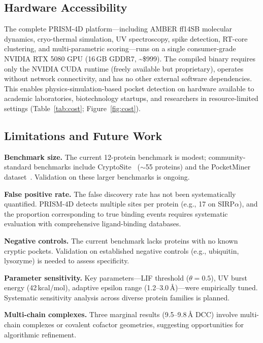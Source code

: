 \documentclass{sn-jnl}
\begin{document}
\subsection{Hardware Accessibility}

The complete PRISM-4D platform---including AMBER ff14SB molecular dynamics, cryo-thermal
simulation, UV spectroscopy, spike detection, RT-core clustering, and multi-parametric
scoring---runs on a single consumer-grade NVIDIA RTX 5080 GPU (16\,GB GDDR7,
\textasciitilde\$999). The compiled binary requires only the NVIDIA CUDA runtime (freely
available but proprietary), operates without network connectivity, and has no other external
software dependencies. This enables physics-simulation-based pocket detection on hardware
available to academic laboratories, biotechnology startups, and researchers in
resource-limited settings (Table~\ref{tab:cost}; Figure~\ref{fig:cost}).

\subsection{Limitations and Future Work}

\textbf{Benchmark size.} The current 12-protein benchmark is modest; community-standard
benchmarks include CryptoSite~\cite{cimermancic2016} ($\sim$55 proteins) and the PocketMiner
dataset~\cite{meller2023}. Validation on these larger benchmarks is ongoing.

\textbf{False positive rate.} The false discovery rate has not been systematically quantified.
PRISM-4D detects multiple sites per protein (e.g., 17 on SIRP$\alpha$), and the proportion
corresponding to true binding events requires systematic evaluation with comprehensive
ligand-binding databases.

\textbf{Negative controls.} The current benchmark lacks proteins with no known cryptic
pockets. Validation on established negative controls (e.g., ubiquitin, lysozyme) is needed to
assess specificity.

\textbf{Parameter sensitivity.} Key parameters---LIF threshold ($\theta = 0.5$), UV burst
energy (42\,kcal/mol), adaptive epsilon range (1.2--3.0\,\AA{})---were empirically tuned.
Systematic sensitivity analysis across diverse protein families is planned.

\textbf{Multi-chain complexes.} Three marginal results (9.5--9.8\,\AA{} DCC) involve
multi-chain complexes or covalent cofactor geometries, suggesting opportunities for
algorithmic refinement.
\end{document}
